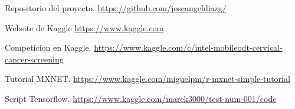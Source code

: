% 

\begin{thebibliography}{99}

	\emph{} Repositorio del proyecto. \url{https://github.com/joseangeldiazg/}

	\emph{} Website de Kaggle \url{https://www.kaggle.com}	

	\emph{} Competicion en Kaggle. \url{https://www.kaggle.com/c/intel-mobileodt-cervical-cancer-screening}
	
	\emph{} Tutorial MXNET. \url{https://www.kaggle.com/miguelpm/r-mxnet-simple-tutorial}
	
	\emph{} Script Tensorflow. \url{https://www.kaggle.com/marek3000/test-num-001/code}
		
		
\end{thebibliography}
